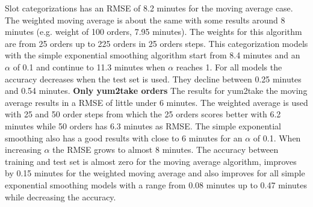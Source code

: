 Slot categorizations has an RMSE of 8.2 minutes for the moving average case. The weighted moving average is about the same with some results around 8 minutes (e.g. weight of 100 orders, 7.95 minutes). The weights for this algorithm are from 25 orders up to 225 orders in 25 orders steps. This categorization models with the simple exponential smoothing algorithm start from 8.4 minutes and an $\alpha$ of 0.1 and continue to 11.3 minutes when $\alpha$ reaches 1. For all models the accuracy decreases when the test set is used. They decline between 0.25 minutes and 0.54 minutes.
\newline\newline\textbf{Only yum2take orders}\newline
The results for yum2take the moving average results in a RMSE of little under 6 minutes. The weighted average is used with 25 and 50 order steps from which the 25 orders scores better with 6.2 minutes while 50 orders has 6.3 minutes as RMSE. The simple exponential smoothing also has a good results with close to 6 minutes for an $\alpha$ of 0.1. When increasing $\alpha$ the RMSE grows to almost 8 minutes. The accuracy between training and test set is almost zero for the moving average algorithm, improves by 0.15 minutes for the weighted moving average and also improves for all simple exponential smoothing models with a range from 0.08 minutes up to 0.47 minutes while decreasing the accuracy.
